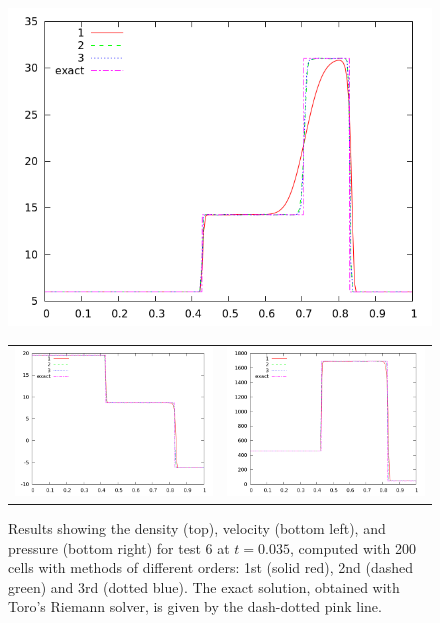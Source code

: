 \documentclass[10pt]{article}
\begin{document}
\begin{figure}[h]
  \begin{center}
     \includegraphics[width=.95\textwidth]{den_T6.png}	
	\begin{tabular}{cc}
      \includegraphics[width=.475\textwidth]{vel_T6.png} &
	  \includegraphics[width=.475\textwidth]{prs_T6.png}
	\end{tabular}
  \end{center}
  \caption{Results showing the density (top), velocity (bottom left), and pressure (bottom right) for test 6 at $t=0.035$, computed with 200 cells with methods of different orders: 1st (solid red), 2nd (dashed green) and 3rd (dotted blue). The exact solution, obtained with Toro's Riemann solver, is given by the dash-dotted pink line.}
  \label{fig:den_T6}
\end{figure}
\end{document}

